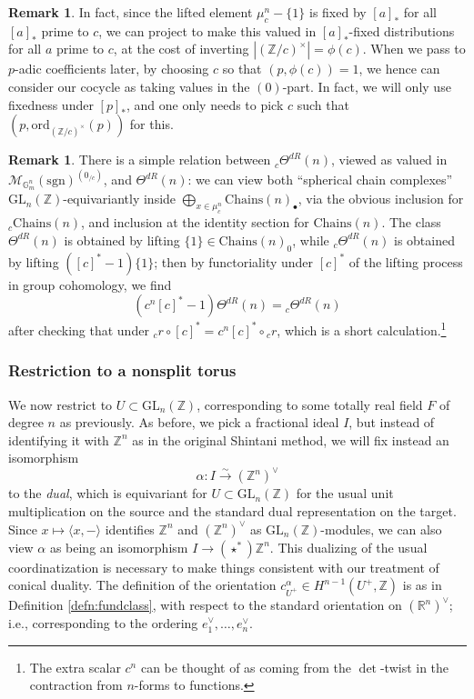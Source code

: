 \documentclass[10pt]{amsart}
\theoremstyle{definition}
\newtheorem{rem}[thm]{Remark}
\newcommand{\Z}{\mathbb{Z}}
\newcommand{\R}{\mathbb{R}}
\newcommand{\sgn}{\mathrm{sgn}}
\newcommand{\Chains}{\mathrm{Chains}}
\newcommand{\G}{\mathbb{G}}
\newcommand{\GL}{\mathrm{GL}}
\numberwithin{equation}{section}
\begin{document}
    \begin{rem} \label{rem:finitetofixed}
    In fact, since the lifted element $\mu_c^n - \{1\}$ is fixed by $[a]_*$ for all $[a]_*$ prime to $c$, we can project to make this valued in $[a]_*$-fixed distributions for all $a$ prime to $c$, at the cost of inverting $|(\Z/c)^\times|=\phi(c)$. When we pass to $p$-adic coefficients later, by choosing $c$ so that $(p,\phi(c))=1$, we hence can consider our cocycle as taking values in the $(0)$-part. In fact, we will only use fixedness under $[p]_*$, and one only needs to pick $c$ such that $(p, \mathrm{ord}_{(\Z/c)^\times}(p))$ for this.
    \end{rem}

    \begin{rem} \label{rem:smoothsharks}
    There is a simple relation between ${}_c\Theta^{dR}(n)$, viewed as valued in $\mathcal{M}_{\G_m^n}(\sgn)^{(0_{/c})}$, and $\Theta^{dR}(n)$: we can view both ``spherical chain complexes'' $\GL_n(\Z)$-equivariantly inside $\bigoplus_{x\in \mu_c^n} \Chains(n)_\bullet$, via the obvious inclusion for ${}_c\Chains(n)$, and inclusion at the identity section for $\Chains(n)$. The class $\Theta^{dR}(n)$ is obtained by lifting $\{1\}\in \Chains(n)_0$, while ${}_c\Theta^{dR}(n)$ is obtained by lifting $([c]^*-1)\{1\}$; then by functoriality under $[c]^*$ of the lifting process in group cohomology, we find
    \[
    (c^n[c]^*-1)\Theta^{dR}(n)={}_c\Theta^{dR}(n)
    \]
    after checking that under ${}_cr\circ [c]^* = c^n[c]^* \circ {}_cr$, which is a short calculation.\footnote{The extra scalar $c^n$ can be thought of as coming from the $\det$-twist in the contraction from $n$-forms to functions.}
    \end{rem}
    
    \subsubsection{Restriction to a nonsplit torus}

    We now restrict to $U\subset \GL_n(\Z)$, corresponding to some totally real field $F$ of degree $n$ as previously. As before, we pick a fractional ideal $I$, but instead of identifying it with $\Z^n$ as in the original Shintani method, we will fix instead an isomorphism
    \[
        \alpha: I\xrightarrow{\sim} (\Z^n)^\vee
    \]
    to the \emph{dual}, which is equivariant for $U\subset \GL_n(\Z)$ for the usual unit multiplication on the source and the standard dual representation on the target. Since $x\mapsto \langle x, -\rangle$ identifies $\Z^n$ and $(\Z^n)^\vee$ as $\GL_n(\Z)$-modules, we can also view $\alpha$ as being an isomorphism $I\to (\star^*)\Z^n$. This dualizing of the usual coordinatization is necessary to make things consistent with our treatment of conical duality. The definition of the orientation $c_{U^+}^\alpha\in H^{n-1}(U^+,\Z)$ is as in Definition \ref{defn:fundclass}, with respect to the standard orientation on $(\R^n)^\vee$; i.e., corresponding to the ordering $e_1^\vee,\ldots, e_n^\vee$.
    
\end{document}
